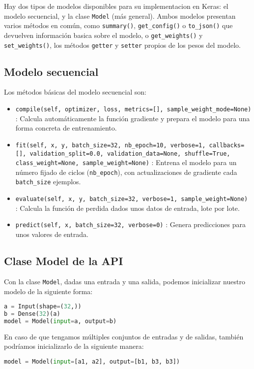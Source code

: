Hay dos tipos de modelos disponibles para su implementacion en Keras: el modelo secuencial, y la clase \lstinline{Model} (más general). Ambos modelos presentan varios métodos en común, como \lstinline{summary()}, \lstinline{get_config()} o \lstinline{to_json()} que devuelven información basica sobre el modelo, o \lstinline{get_weights()} y \lstinline{set_weights()}, los métodos \lstinline{getter} y \lstinline{setter} propios de los pesos del modelo.
\subsection{Modelo secuencial}
Los métodos básicas del modelo secuencial son:
\begin{itemize}
\item \lstinline{compile(self, optimizer, loss, metrics=[], sample_weight_mode=None)} : Calcula automáticamente la función gradiente y prepara el modelo para una forma concreta de entrenamiento.
\item \lstinline{fit(self, x, y, batch_size=32, nb_epoch=10, verbose=1, callbacks=[], validation_split=0.0, validation_data=None, shuffle=True, class_weight=None, sample_weight=None)} : Entrena el modelo para un número fijado de ciclos (\lstinline{nb_epoch}), con actualizaciones de gradiente cada \lstinline{batch_size} ejemplos.
\item \lstinline{evaluate(self, x, y, batch_size=32, verbose=1, sample_weight=None)} : Calcula la función de perdida dados unos datos de entrada, lote por lote.
\item \lstinline{predict(self, x, batch_size=32, verbose=0)} : Genera predicciones para unos valores de entrada.
\end{itemize}
\subsection{Clase Model de la API}
Con la clase \lstinline{Model}, dadas una entrada y una salida, podemos inicializar nuestro modelo de la siguiente forma:
\begin{lstlisting}[language=Python]
a = Input(shape=(32,))
b = Dense(32)(a)
model = Model(input=a, output=b)
\end{lstlisting}
En caso de que tengamos múltiples conjuntos de entradas y de salidas, también podríamos inicializarlo de la siguiente manera:
\begin{lstlisting}[language=Python]
model = Model(input=[a1, a2], output=[b1, b3, b3])
\end{lstlisting}
